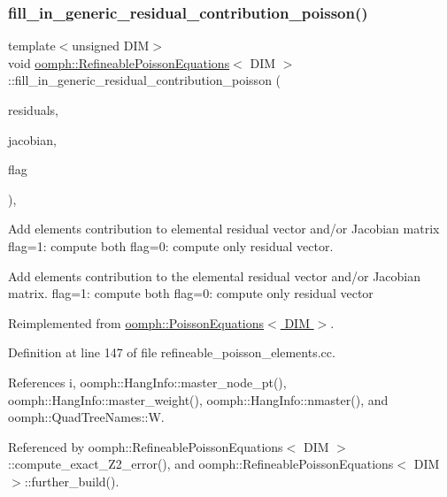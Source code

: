 \subsubsection{\texorpdfstring{fill\+\_\+in\+\_\+generic\+\_\+residual\+\_\+contribution\+\_\+poisson()}{fill\_in\_generic\_residual\_contribution\_poisson()}}
{\footnotesize\ttfamily template$<$unsigned D\+IM$>$ \\
void \hyperlink{classoomph_1_1RefineablePoissonEquations}{oomph\+::\+Refineable\+Poisson\+Equations}$<$ D\+IM $>$\+::fill\+\_\+in\+\_\+generic\+\_\+residual\+\_\+contribution\+\_\+poisson (\begin{DoxyParamCaption}\item[{\hyperlink{classoomph_1_1Vector}{Vector}$<$ double $>$ \&}]{residuals,  }\item[{\hyperlink{classoomph_1_1DenseMatrix}{Dense\+Matrix}$<$ double $>$ \&}]{jacobian,  }\item[{const unsigned \&}]{flag }\end{DoxyParamCaption})\hspace{0.3cm}{\ttfamily [private]}, {\ttfamily [virtual]}}



Add element\textquotesingle{}s contribution to elemental residual vector and/or Jacobian matrix flag=1\+: compute both flag=0\+: compute only residual vector. 

Add element\textquotesingle{}s contribution to the elemental residual vector and/or Jacobian matrix. flag=1\+: compute both flag=0\+: compute only residual vector 

Reimplemented from \hyperlink{classoomph_1_1PoissonEquations_a02c40bfa9b59fa7935677999623da633}{oomph\+::\+Poisson\+Equations$<$ D\+I\+M $>$}.



Definition at line 147 of file refineable\+\_\+poisson\+\_\+elements.\+cc.



References i, oomph\+::\+Hang\+Info\+::master\+\_\+node\+\_\+pt(), oomph\+::\+Hang\+Info\+::master\+\_\+weight(), oomph\+::\+Hang\+Info\+::nmaster(), and oomph\+::\+Quad\+Tree\+Names\+::W.



Referenced by oomph\+::\+Refineable\+Poisson\+Equations$<$ D\+I\+M $>$\+::compute\+\_\+exact\+\_\+\+Z2\+\_\+error(), and oomph\+::\+Refineable\+Poisson\+Equations$<$ D\+I\+M $>$\+::further\+\_\+build().

\mbox{\label{classoomph_1_1RefineablePoissonEquations_adb5a117ca7556e66af8f3eeaf0bbee7a}} 
